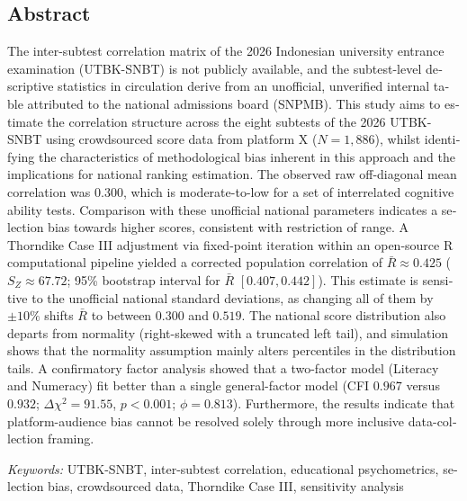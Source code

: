 \begin{otherlanguage}{english}
\section*{Abstract}
\noindent
The inter-subtest correlation matrix of the 2026 Indonesian university entrance examination (UTBK-SNBT) is not publicly available, and the subtest-level descriptive statistics in circulation derive from an unofficial, unverified internal table attributed to the national admissions board (SNPMB). This study aims to estimate the correlation structure across the eight subtests of the 2026 UTBK-SNBT using crowdsourced score data from platform X ($N = 1,886$), whilst identifying the characteristics of methodological bias inherent in this approach and the implications for national ranking estimation. The observed raw off-diagonal mean correlation was $0.300$, which is moderate-to-low for a set of interrelated cognitive ability tests. Comparison with these unofficial national parameters indicates a selection bias towards higher scores, consistent with restriction of range. A Thorndike Case III adjustment via fixed-point iteration within an open-source R computational pipeline yielded a corrected population correlation of $\bar{R} \approx 0.425$ ($S_Z \approx 67.72$; 95\% bootstrap interval for $\bar{R}$ $[0.407, 0.442]$). This estimate is sensitive to the unofficial national standard deviations, as changing all of them by $\pm 10\%$ shifts $\bar{R}$ to between $0.300$ and $0.519$. The national score distribution also departs from normality (right-skewed with a truncated left tail), and simulation shows that the normality assumption mainly alters percentiles in the distribution tails. A confirmatory factor analysis showed that a two-factor model (Literacy and Numeracy) fit better than a single general-factor model (CFI $0.967$ versus $0.932$; $\Delta\chi^2 = 91.55$, $p < 0.001$; $\phi = 0.813$). Furthermore, the results indicate that platform-audience bias cannot be resolved solely through more inclusive data-collection framing.

\textit{Keywords:} UTBK-SNBT, inter-subtest correlation, educational psychometrics, selection bias, crowdsourced data, Thorndike Case III, sensitivity analysis
\end{otherlanguage}